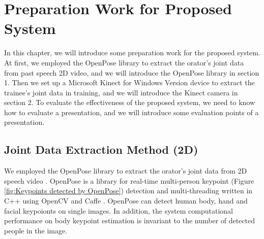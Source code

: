 \chapter{Preparation Work for Proposed System}

\par In this chapter, we will introduce some preparation work for the proposed system. At first, we employed the OpenPose library \cite{cao2017realtime} to extract the orator's joint data from past speech 2D video, and we will introduce the OpenPose library in section 1. Then we set up a Microsoft Kinect for Windows Version device \cite{Shotton2011} to extract the trainee's joint data in training, and we will introduce the Kinect camera in section 2. To evaluate the effectiveness of the proposed system, we need to know how to evaluate a presentation, and we will introduce some evaluation points of a presentation.

\section{Joint Data Extraction Method (2D)}
We employed the OpenPose library to extract the orator's joint data from 2D speech video \cite{cao2017realtime}. OpenPose is a library for real-time multi-person keypoint (Figure \ref{fig:Keypoints detected by OpenPose}) detection and multi-threading written in C++ using OpenCV and Caffe \cite{Jia2014}. OpenPose can detect human body, hand and facial keypoionts on single images. In addition, the system computational performance on body keypoint estimation is invariant to the number of detected people in the image.

